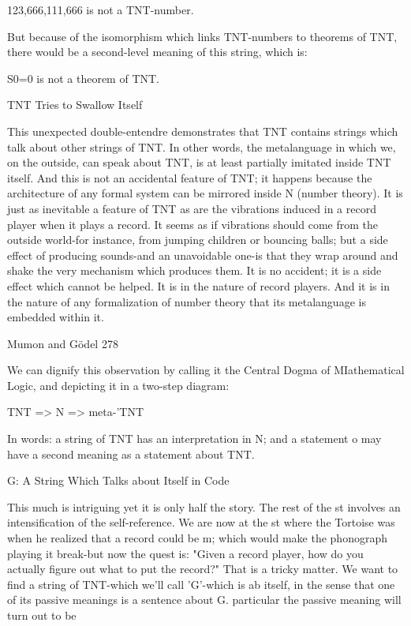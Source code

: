                          123,666,111,666 is not a TNT-number.

But because of the isomorphism which links TNT-numbers to theorems of TNT, there
would be a second-level meaning of this string, which is:

                             S0=0 is not a theorem of TNT.

                              TNT Tries to Swallow Itself

This unexpected double-entendre demonstrates that TNT contains strings which talk
about other strings of TNT. In other words, the metalanguage in which we, on the
outside, can speak about TNT, is at least partially imitated inside TNT itself. And this is
not an accidental feature of TNT; it happens because the architecture of any formal
system can be mirrored inside N (number theory). It is just as inevitable a feature of TNT
as are the vibrations induced in a record player when it plays a record. It seems as if
vibrations should come from the outside world-for instance, from jumping children or
bouncing balls; but a side effect of producing sounds-and an unavoidable one-is that they
wrap around and shake the very mechanism which produces them. It is no accident; it is a
side effect which cannot be helped. It is in the nature of record players. And it is in the
nature of any formalization of number theory that its metalanguage is embedded within it.




Mumon and Gödel                                                                        278

       We can dignify this observation by calling it the Central Dogma of MIathematical
Logic, and depicting it in a two-step diagram:

                               TNT => N => meta-'TNT

In words: a string of TNT has an interpretation in N; and a statement o may have a
second meaning as a statement about TNT.

                      G: A String Which Talks about Itself in Code

This much is intriguing yet it is only half the story. The rest of the st involves an
intensification of the self-reference. We are now at the st where the Tortoise was when he
realized that a record could be m; which would make the phonograph playing it break-but
now the quest is: "Given a record player, how do you actually figure out what to put the
record?" That is a tricky matter.
        We want to find a string of TNT-which we'll call 'G'-which is ab itself, in the
sense that one of its passive meanings is a sentence about G. particular the passive
meaning will turn out to be

